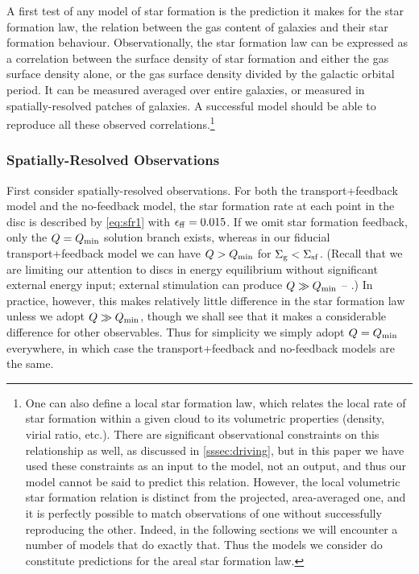 \documentclass[useAMS,usenatbib]{mn2e}
\newcommand{\Qmin}{Q_{\rm min}}
\begin{document}
A first test of any model of star formation is the prediction it makes for the star formation law, the relation between the gas content of galaxies and their star formation behaviour. Observationally, the star formation law can be expressed as a correlation between the surface density of star formation and either the gas surface density alone, or the gas surface density divided by the galactic orbital period. It can be measured averaged over entire galaxies, or measured in spatially-resolved patches of galaxies. A successful model should be able to reproduce all these observed correlations.\footnote{One can also define a local star formation law, which relates the local rate of star formation within a given cloud to its volumetric properties (density, virial ratio, etc.). There are significant observational constraints on this relationship as well, as discussed in \autoref{sssec:driving}, but in this paper we have used these constraints as an input to the model, not an output, and thus our model cannot be said to predict this relation. However, the local volumetric star formation relation is distinct from the projected, area-averaged one, and it is perfectly possible to match observations of one without successfully reproducing the other. Indeed, in the following sections we will encounter a number of models that do exactly that. Thus the models we consider do constitute predictions for the areal star formation law.}

\subsubsection{Spatially-Resolved Observations}

First consider spatially-resolved observations. For both the transport+feedback model and the no-feedback model, the star formation rate at each point in the disc is described by \autoref{eq:sfr1} with $\epsilon_{\rm ff} = 0.015$. If we omit star formation feedback, only the $Q = \Qmin$ solution branch exists, whereas in our fiducial transport+feedback model we can have $Q > \Qmin$ for $\Sigma_{\rm g} < \Sigma_{\rm sf}$. (Recall that we are limiting our attention to discs in energy equilibrium without significant external energy input; external stimulation can produce $Q \gg Q_{\rm min}$ -- \citealt{inoue16a}.) In practice, however, this makes relatively little difference in the star formation law unless we adopt $Q \gg \Qmin$, though we shall see that it makes a considerable difference for other observables. Thus for simplicity we simply adopt $Q = \Qmin$ everywhere, in which case the transport+feedback and no-feedback models are the same.
\end{document}
